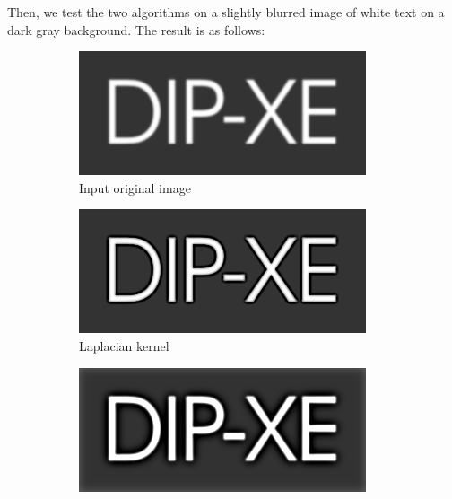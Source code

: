 \documentclass[UTF8]{ctexart}
\begin{document}
Then, we test the two algorithms on a slightly blurred image of white text on a dark gray background. The result is as follows:\\
\begin{figure}[htbp]
    \centering
    \begin{subfigure}{0.3\textwidth}
        \centering
        \includegraphics[width=\linewidth]{dipxe_text.png}
        \caption{Input original image}
    \end{subfigure}%
    \hfill
    \begin{subfigure}{0.3\textwidth}
        \centering
        \includegraphics[width=\linewidth]{dipxe_text_laplace_sharpen.png}
        \caption{Laplacian kernel}
    \end{subfigure}%
    \hfill
    \begin{subfigure}{0.3\textwidth}
        \centering
        \includegraphics[width=\linewidth]{dipxe_text_masking_sharpen.png}

\end{subfigure}
\end{figure}
\end{document}
